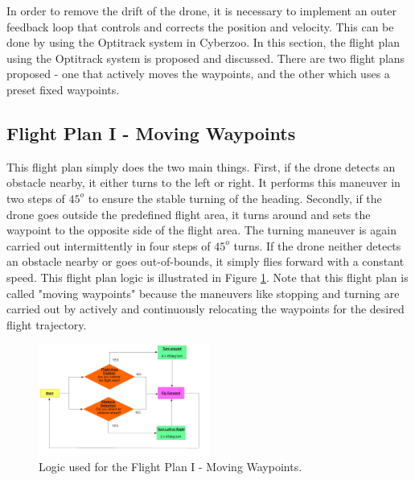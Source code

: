 In order to remove the drift of the drone, it is necessary to implement an outer feedback loop that controls and corrects the position and velocity. This can be done by using the Optitrack system in Cyberzoo. In this section, the flight plan using the Optitrack system is proposed and discussed. There are two flight plans proposed - one that actively moves the waypoints, and the other which uses a preset fixed waypoints.\\

\subsection{Flight Plan I - Moving Waypoints}
This flight plan simply does the two main things. First, if the drone detects an obstacle nearby, it either turns to the left or right. It performs this maneuver in two steps of $45^o$ to ensure the stable turning of the heading. Secondly, if the drone goes outside the predefined flight area, it turns around and sets the waypoint to the opposite side of the flight area. The turning maneuver is again carried out intermittently in four steps of $45^o$ turns. If the drone neither detects an obstacle nearby or goes out-of-bounds, it simply flies forward with a constant speed. This flight plan logic is illustrated in Figure \ref{fp1}. Note that this flight plan is called "moving waypoints" because the maneuvers like stopping and turning are carried out by actively and continuously relocating the waypoints for the desired flight trajectory.

\begin{figure}[H]
	\centering
	\includegraphics[width = 0.5\textwidth]{Figures/FP1.png}
	\caption{Logic used for the Flight Plan I - Moving Waypoints.}
	\label{fp1}
\end{figure}